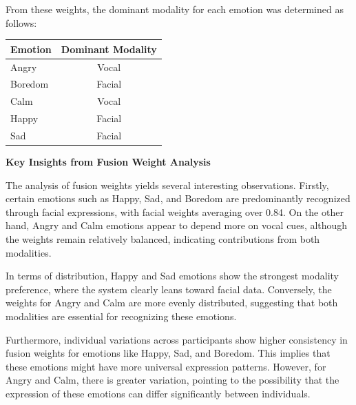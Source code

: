 From these weights, the dominant modality for each emotion was determined as follows:

\begin{center}
\begin{tabular}{lc}

\textbf{Emotion} & \textbf{Dominant Modality} \\
\midrule
Angry   & Vocal \\
Boredom & Facial \\
Calm    & Vocal \\
Happy   & Facial \\
Sad     & Facial \\

\end{tabular}
\end{center}

\textbf{Key Insights from Fusion Weight Analysis}

The analysis of fusion weights yields several interesting observations. Firstly, certain emotions such as Happy, Sad, and Boredom are predominantly recognized through facial expressions, with facial weights averaging over 0.84. On the other hand, Angry and Calm emotions appear to depend more on vocal cues, although the weights remain relatively balanced, indicating contributions from both modalities.

In terms of distribution, Happy and Sad emotions show the strongest modality preference, where the system clearly leans toward facial data. Conversely, the weights for Angry and Calm are more evenly distributed, suggesting that both modalities are essential for recognizing these emotions.

Furthermore, individual variations across participants show higher consistency in fusion weights for emotions like Happy, Sad, and Boredom. This implies that these emotions might have more universal expression patterns. However, for Angry and Calm, there is greater variation, pointing to the possibility that the expression of these emotions can differ significantly between individuals.
